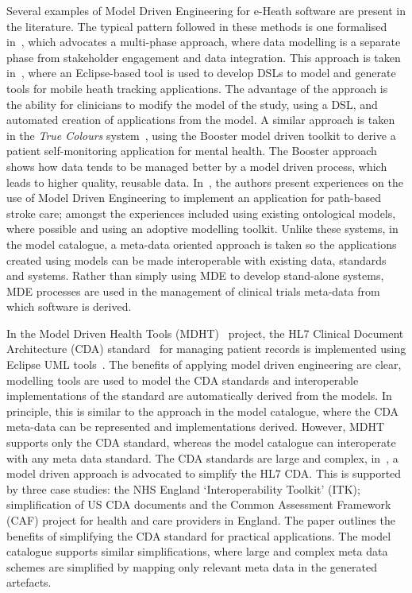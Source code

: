 Several examples of Model Driven Engineering for e-Heath software are present in the literature. The typical pattern followed in these methods is one formalised in~\cite{pay12}, which advocates a multi-phase approach, where data modelling is a separate phase from stakeholder engagement and data integration. This approach is taken in~\cite{kham08}, where an Eclipse-based tool is used to develop DSLs to model and generate tools for mobile heath tracking applications. The advantage of the approach is the ability for clinicians to modify the model of the study, using a DSL, and automated creation of applications from the model. A similar approach is taken in the \emph{True Colours} system~\cite{dav14}, using the Booster model driven toolkit to derive a patient self-monitoring application for mental health. The Booster approach shows how data tends to be managed better by a model driven process, which leads to higher quality, reusable data. In~\cite{schl15}, the authors present experiences on the use of Model Driven Engineering to implement an application for path-based stroke care; amongst the experiences included using existing ontological models, where possible and using an adoptive modelling toolkit. Unlike these systems, in the model catalogue, a meta-data oriented approach is taken so the applications created using models can be made interoperable with existing data, standards and systems. Rather than simply using MDE to develop stand-alone systems, MDE processes are used in the management of clinical trials meta-data from which software is derived. 

In the Model Driven Health Tools (MDHT)~\cite{MDHT} project, the HL7 Clinical Document Architecture (CDA) standard~\cite{doli06} for managing patient records is implemented using Eclipse UML tools~\cite{EUML}. The benefits of applying model driven engineering are clear, modelling tools are used to model the CDA standards and interoperable implementations of the standard are automatically derived from the models. In principle, this is similar to the approach in the model catalogue, where the CDA meta-data can be represented and implementations derived. However, MDHT supports only the CDA standard, whereas the model catalogue can interoperate with any meta data standard. The CDA standards are large and complex, in~\cite{sco12}, a model driven approach is advocated to simplify the HL7 CDA. This is supported by three case studies: the NHS England ‘Interoperability Toolkit’ (ITK); simplification of US CDA documents and the Common Assessment Framework (CAF) project for health and care providers in England. The paper outlines the benefits of simplifying the CDA standard for practical applications. The model catalogue supports similar simplifications, where large and complex meta data schemes are simplified by mapping only relevant meta data in the generated artefacts.


